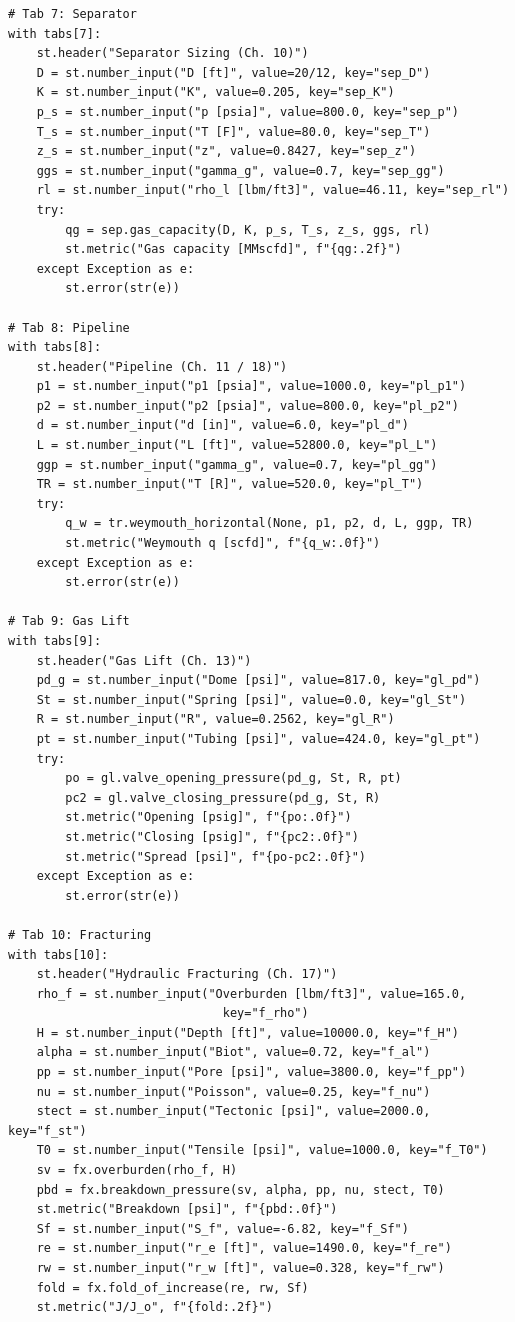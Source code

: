 \documentclass[10pt,a4paper,openany]{book}
\begin{document}
\begin{lstlisting}
# Tab 7: Separator
with tabs[7]:
    st.header("Separator Sizing (Ch. 10)")
    D = st.number_input("D [ft]", value=20/12, key="sep_D")
    K = st.number_input("K", value=0.205, key="sep_K")
    p_s = st.number_input("p [psia]", value=800.0, key="sep_p")
    T_s = st.number_input("T [F]", value=80.0, key="sep_T")
    z_s = st.number_input("z", value=0.8427, key="sep_z")
    ggs = st.number_input("gamma_g", value=0.7, key="sep_gg")
    rl = st.number_input("rho_l [lbm/ft3]", value=46.11, key="sep_rl")
    try:
        qg = sep.gas_capacity(D, K, p_s, T_s, z_s, ggs, rl)
        st.metric("Gas capacity [MMscfd]", f"{qg:.2f}")
    except Exception as e:
        st.error(str(e))

# Tab 8: Pipeline
with tabs[8]:
    st.header("Pipeline (Ch. 11 / 18)")
    p1 = st.number_input("p1 [psia]", value=1000.0, key="pl_p1")
    p2 = st.number_input("p2 [psia]", value=800.0, key="pl_p2")
    d = st.number_input("d [in]", value=6.0, key="pl_d")
    L = st.number_input("L [ft]", value=52800.0, key="pl_L")
    ggp = st.number_input("gamma_g", value=0.7, key="pl_gg")
    TR = st.number_input("T [R]", value=520.0, key="pl_T")
    try:
        q_w = tr.weymouth_horizontal(None, p1, p2, d, L, ggp, TR)
        st.metric("Weymouth q [scfd]", f"{q_w:.0f}")
    except Exception as e:
        st.error(str(e))

# Tab 9: Gas Lift
with tabs[9]:
    st.header("Gas Lift (Ch. 13)")
    pd_g = st.number_input("Dome [psi]", value=817.0, key="gl_pd")
    St = st.number_input("Spring [psi]", value=0.0, key="gl_St")
    R = st.number_input("R", value=0.2562, key="gl_R")
    pt = st.number_input("Tubing [psi]", value=424.0, key="gl_pt")
    try:
        po = gl.valve_opening_pressure(pd_g, St, R, pt)
        pc2 = gl.valve_closing_pressure(pd_g, St, R)
        st.metric("Opening [psig]", f"{po:.0f}")
        st.metric("Closing [psig]", f"{pc2:.0f}")
        st.metric("Spread [psi]", f"{po-pc2:.0f}")
    except Exception as e:
        st.error(str(e))

# Tab 10: Fracturing
with tabs[10]:
    st.header("Hydraulic Fracturing (Ch. 17)")
    rho_f = st.number_input("Overburden [lbm/ft3]", value=165.0,
                              key="f_rho")
    H = st.number_input("Depth [ft]", value=10000.0, key="f_H")
    alpha = st.number_input("Biot", value=0.72, key="f_al")
    pp = st.number_input("Pore [psi]", value=3800.0, key="f_pp")
    nu = st.number_input("Poisson", value=0.25, key="f_nu")
    stect = st.number_input("Tectonic [psi]", value=2000.0, key="f_st")
    T0 = st.number_input("Tensile [psi]", value=1000.0, key="f_T0")
    sv = fx.overburden(rho_f, H)
    pbd = fx.breakdown_pressure(sv, alpha, pp, nu, stect, T0)
    st.metric("Breakdown [psi]", f"{pbd:.0f}")
    Sf = st.number_input("S_f", value=-6.82, key="f_Sf")
    re = st.number_input("r_e [ft]", value=1490.0, key="f_re")
    rw = st.number_input("r_w [ft]", value=0.328, key="f_rw")
    fold = fx.fold_of_increase(re, rw, Sf)
    st.metric("J/J_o", f"{fold:.2f}")
\end{lstlisting}
\end{document}
